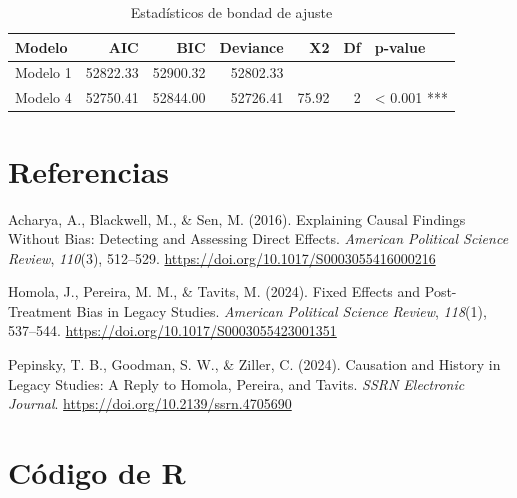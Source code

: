 \documentclass[
  12pt,
  a4paper,
]{article}
\newlength{\cslhangindent}
\newlength{\cslentryspacingunit} %
\newenvironment{CSLReferences}[2] %
 {%
  \setlength{\parindent}{0pt}
  \ifodd #1
  \let\oldpar\par
  \def\par{\hangindent=\cslhangindent\oldpar}
  \fi
  \setlength{\parskip}{#2\cslentryspacingunit}
 }%
 {}
\begin{document}
\begin{table}[!h]

\caption{\label{tab:table3}\label{tab:table3} Estadísticos de bondad de ajuste}
\centering
\begin{tabular}[t]{>{\raggedright\arraybackslash}p{2cm}rrrrrl}
\toprule
\textbf{Modelo} & \textbf{AIC} & \textbf{BIC} & \textbf{Deviance} & \textbf{X2} & \textbf{Df} & \textbf{p-value}\\
\midrule
Modelo 1 & 52822.33 & 52900.32 & 52802.33 &  &  & \\
Modelo 4 & 52750.41 & 52844.00 & 52726.41 & 75.92 & 2 & < 0.001 ***\\
\bottomrule
\end{tabular}
\end{table}

\newpage

\hypertarget{referencias}{%
\section{Referencias}\label{referencias}}

\hypertarget{refs}{}
\begin{CSLReferences}{1}{0}
\leavevmode{}%
Acharya, A., Blackwell, M., \& Sen, M. (2016). Explaining {Causal Findings Without Bias}: {Detecting} and {Assessing Direct Effects}. \emph{American Political Science Review}, \emph{110}(3), 512--529. \url{https://doi.org/10.1017/S0003055416000216}

\leavevmode{}%
Homola, J., Pereira, M. M., \& Tavits, M. (2024). Fixed {Effects} and {Post-Treatment Bias} in {Legacy Studies}. \emph{American Political Science Review}, \emph{118}(1), 537--544. \url{https://doi.org/10.1017/S0003055423001351}

\leavevmode{}%
Pepinsky, T. B., Goodman, S. W., \& Ziller, C. (2024). Causation and {History} in {Legacy Studies}: {A Reply} to {Homola}, {Pereira}, and {Tavits}. \emph{SSRN Electronic Journal}. \url{https://doi.org/10.2139/ssrn.4705690}

\end{CSLReferences}

\pagebreak

\hypertarget{cuxf3digo-de-r}{%
\section{Código de R}\label{cuxf3digo-de-r}}
\end{document}
